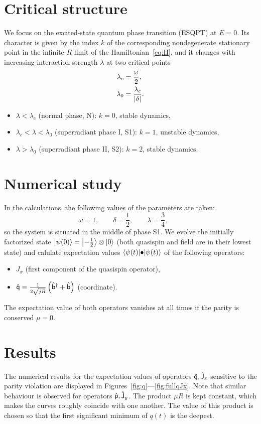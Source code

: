 \documentclass[a4paper,11pt,twoside]{article}
\begin{document}
\section{Critical structure}
	We focus on the excited-state quantum phase transition (ESQPT) at $E=0$.
	Its character is given by the index $k$ of the corresponding nondegenerate stationary point in the infinite-$R$ limit of the Hamiltonian~\eqref{eq:H}, and it changes with increasing interaction strength $\lambda$ at two critical points
	\begin{align}
		\lambda_{c}&=\frac{\omega}{2},\\
		\lambda_{0}&=\frac{\lambda_{c}}{\left|{\delta}\right|}.
	\end{align}
	\begin{itemize}
		\item $\lambda<\lambda_{c}$ (normal phase, N): $k=0$, stable dynamics,
		\item $\lambda_{c}<\lambda<\lambda_{0}$ (superradiant phase I, S1): $k=1$, unstable dynamics,
		\item $\lambda>\lambda_{0}$ (superradiant phase II, S2): $k=2$, stable dynamics.
	\end{itemize}

\section{Numerical study}
	In the calculations, the following values of the parameters are taken:
	\begin{equation}
		\omega=1,\qquad
		\delta=\frac{1}{2},\qquad
		\lambda=\frac{3}{4},\qquad
	\end{equation}
	so the system is situated in the middle of phase S1.
	We evolve the initially factorized state $\left|{\psi(0)}\right\rangle=\left|{-\frac{1}{2}}\right\rangle\otimes\left|{0}\right\rangle$ (both quasispin and field are in their lowest state) and calulate expectation values $\left\langle{\psi(t)}\middle|{\bullet}\middle|{\psi(t)}\right\rangle$ of the following operators:
	\begin{itemize}
		\item $J_{x}$ (first component of the quasispin operator),
		\item $\mathsf{\hat{q}}=\frac{1}{2\sqrt{jR}}\left({\mathsf{\hat{b}}}^{\dagger}+\mathsf{\hat{b}}\right)$ (coordinate).
	\end{itemize}
	The expectation value of both operators vanishes at all times if the parity is conserved $\mu=0$.

\section{Results}
The numerical results for the expectation values of operators $\mathsf{\hat{q}}, \mathsf{\hat{J}}_{x}$ sensitive to the parity violation are displayed in Figures~\ref{fig:q}---\ref{fig:fullqJx}.
Note that similar behaviour is observed for operators $\mathsf{\hat{p}}, \mathsf{\hat{J}}_{y}$.
The product $\mu R$ is kept constant, which makes the curves roughly coincide with one another.
The value of this product is chosen so that the first significant minimum of $q(t)$ is the deepest.
\end{document}
